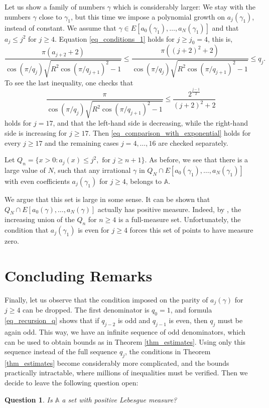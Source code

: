 \documentclass{amsart}
\newtheorem{question}[theorem]{Question}
\begin{document}
	Let us show a family of numbers $\gamma$ which is considerably larger:
	We stay with the numbers $\gamma$ close to $\gamma_1$, but this time we impose a polynomial growth on $a_j(\gamma_1)$, instead of constant.
	We assume that $\gamma \in E[a_0(\gamma_1), \ldots, a_N(\gamma_1)]$ and that $a_j \leq j^2$ for $j \geq 4$.
	Equation \eqref{eq_conditions_1} holds for $j \geq j_0 = 4$, this is,
	\begin{equation}
		\label{eq_firstj1}
		\frac{\pi(a_{j+2}+2)}{\cos(\pi / q_{j}) \sqrt{R^2 \cos(\pi / q_{j+1})^2 - 1}}  
		\leq \frac{\pi((j+2)^2+2)}{\cos(\pi / q_{j}) \sqrt{R^2 \cos(\pi / q_{j+1})^2 - 1}} 
		\leq q_j.
	\end{equation}
	To see the last inequality, one checks that
	\begin{equation}
		\label{eq_comparison_with_exponential}
		\frac{\pi}{\cos(\pi / q_{j}) \sqrt{R^2 \cos(\pi / q_{j+1})^2 - 1}} \leq \frac{2^{\frac{j-1}2}}{(j+2)^2 + 2}
	\end{equation}
	holds for $j = 17$, and that the left-hand side is decreasing, while the right-hand side is increasing for $j\geq 17$. Then \eqref{eq_comparison_with_exponential} holds for every $j \geq 17$ and the remaining cases $j=4, \ldots, 16$ are checked separately.

	Let $Q_n = \{x>0:a_j(x) \leq j^2, \text{ for } j \geq n+1\}$.
	As before, we see that there is a large value of $N$, such that any irrational $\gamma$ in $Q_N \cap E[a_0(\gamma_1), \ldots, a_N(\gamma_1)]$ with even coefficients $a_j(\gamma_1)$ for $j \geq 4$, belongs to $\mathbb A$.

	We argue that this set is large in some sense.
	It can be shown that $Q_N \cap E[a_0(\gamma), \ldots, a_N(\gamma)]$ actually has positive measure.
	Indeed, by \cite[Theorem 30]{khinchin1964continued}, the increasing union of the $Q_n$ for $n \geq 4$ is a full-measure set.
	Unfortunately, the condition that $a_j(\gamma_1)$ is even for $j \geq 4$ forces this set of points to have measure zero.

	\section{Concluding Remarks}

	Finally, let us observe that the condition imposed on the parity of $a_j(\gamma)$ for $j \geq 4$ can be dropped.
	The first denominator is $q_0 = 1$, and formula \eqref{eq_recursion_q} shows that if $q_{j-2}$ is odd and $q_{j-1}$ is even, then $q_j$ must be again odd.
	This way, we have an infinite sequence of odd denominators, which can be used to obtain bounds as in Theorem \ref{thm_estimates}.
	Using only this sequence instead of the full sequence $q_j$, the conditions in Theorem \ref{thm_estimates} become considerably more complicated, and the bounds practically intractable, where millions of inequalities must be verified.
	Then we decide to leave the following question open:
	\begin{question}
		Is $\mathbb A$ a set with positive Lebesgue measure?
	\end{question}
\end{document}
